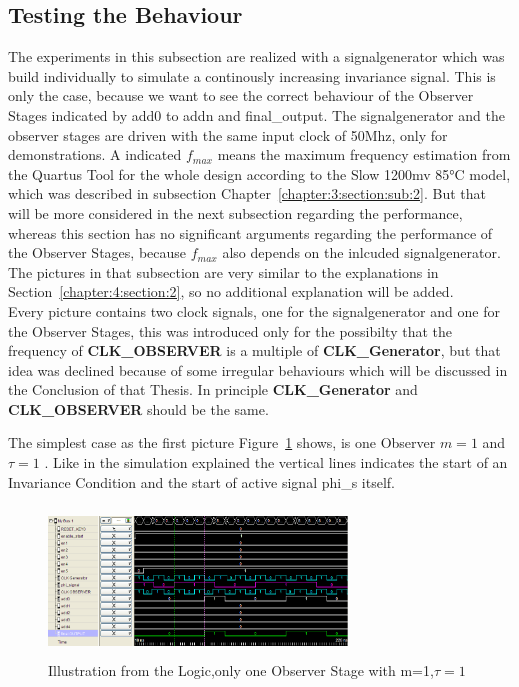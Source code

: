 \subsection{Testing the Behaviour}
\label{chapter:4:section:3:subsection:1}
The experiments in this subsection are realized with a signalgenerator which was build individually to simulate a continously increasing invariance signal. 
This is only the case, because we want to see the correct behaviour of the Observer Stages indicated by add0 to addn and final\_output. 
The signalgenerator and the observer stages are driven with the same input clock of 50Mhz, only for demonstrations. 
A indicated $f_{max}$ means the maximum frequency estimation from the Quartus Tool for the whole design according to the Slow 1200mv 85°C model, which was described in subsection Chapter~\ref{chapter:3:section:sub:2}. 
But that will be more considered in the next subsection regarding the performance, whereas this section has no significant arguments regarding the performance of the Observer Stages, 
because $f_{max}$ also depends on the inlcuded signalgenerator. 
The pictures in that subsection are very similar to the explanations in Section~\ref{chapter:4:section:2}, so no additional explanation will be added. \\
Every picture contains two clock signals, one for the signalgenerator and one for the Observer Stages, this was introduced only for the possibilty that the frequency of \textbf{CLK\_OBSERVER} 
is a multiple of \textbf{CLK\_Generator}, but that idea was declined because of some irregular behaviours which will be discussed in the Conclusion of that Thesis. 
In principle \textbf{CLK\_Generator} and \textbf{CLK\_OBSERVER} should be the same. 


The simplest case as the first picture Figure~\ref{fig:logicanalyzer:m1:t1} shows, is one Observer $m = 1$ and $\tau = 1$ .
Like in the simulation explained the vertical lines indicates the start of an Invariance Condition and the start of active signal phi\_s itself.

\begin{figure}[]
\centering
\includegraphics[width=300px,height=150px]{../../pictures/Logicanalyzer/Observer_1_Tau_1.png}
\caption[Logicanalyzer m=1,$\tau=1$]{Illustration from the Logic,only one Observer Stage with m=1,$\tau = 1$}
\label{fig:logicanalyzer:m1:t1}
\end{figure}


